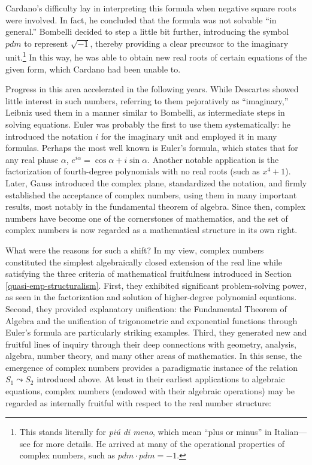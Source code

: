 \documentclass[11pt,a4paper]{book}
\theoremstyle{plain}
\begin{document}
Cardano’s difficulty lay in interpreting this formula when negative square roots were involved. In fact, he concluded that the formula was not solvable “in general.” Bombelli decided to step a little bit further, introducing the symbol $pdm$ to represent $\sqrt{-1}$, thereby providing a clear precursor to the imaginary unit.\footnote{This stands literally for \textit{piú di meno}, which mean “plus or minus” in Italian—see \textcite{Christen2018} for more details. He arrived at many of the operational properties of complex numbers, such as $pdm \cdot pdm = -1$.} In this way, he was able to obtain new real roots of certain equations of the given form, which Cardano had been unable to.

Progress in this area accelerated in the following years. While Descartes showed little interest in such numbers, referring to them pejoratively as “imaginary,” Leibniz used them in a manner similar to Bombelli, as intermediate steps in solving equations. Euler was probably the first to use them systematically: he introduced the notation $i$ for the imaginary unit and employed it in many formulas. Perhaps the most well known is Euler's formula, which states that for any real phase $\alpha$, $e^{i\alpha} = \cos \alpha + i \sin \alpha$. Another notable application is the factorization of fourth-degree polynomials with no real roots (such as $x^4 + 1$). Later, Gauss introduced the complex plane, standardized the notation, and firmly established the acceptance of complex numbers, using them in many important results, most notably in the fundamental theorem of algebra. Since then, complex numbers have become one of the cornerstones of mathematics, and the set of complex numbers is now regarded as a mathematical structure in its own right.

What were the reasons for such a shift? In my view, complex numbers constituted the simplest algebraically closed extension of the real line while satisfying the three criteria of mathematical fruitfulness introduced in Section \ref{quasi-emp-structuralism}. First, they exhibited significant problem-solving power, as seen in the factorization and solution of higher-degree polynomial equations. Second, they provided explanatory unification: the Fundamental Theorem of Algebra and the unification of trigonometric and exponential functions through Euler's formula are particularly striking examples. Third, they generated new and fruitful lines of inquiry through their deep connections with geometry, analysis, algebra, number theory, and many other areas of mathematics. In this sense, the emergence of complex numbers provides a paradigmatic instance of the relation $S_1 \leadsto S_2$ introduced above. At least in their earliest applications to algebraic equations, complex numbers (endowed with their algebraic operations) may be regarded as internally fruitful with respect to the real number structure:
\end{document}
